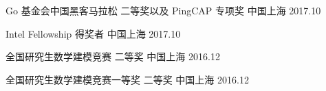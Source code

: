 
\begin{cvhonors}

  \cvhonor
    {Go 基金会中国黑客⻢拉松} %
    {二等奖以及 PingCAP 专项奖} %
    {中国上海} %
    {2017.10} %

  \cvhonor
    {Intel Fellowship} %
    {得奖者} %
    {中国上海} %
    {2017.10} %

  \cvhonor
    {全国研究生数学建模竞赛} %
    {二等奖} %
    {中国上海} %
    {2016.12} %

  \cvhonor
    {全国研究生数学建模竞赛一等奖} %
    {二等奖} %
    {中国上海} %
    {2016.12} %
\end{cvhonors}
